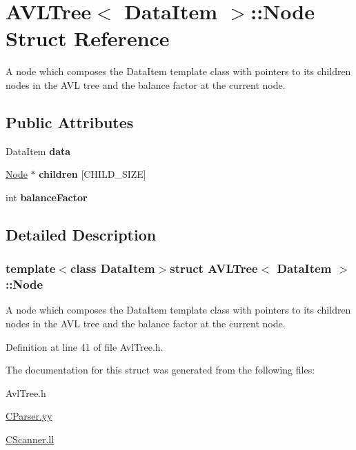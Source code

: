 \hypertarget{structAVLTree_1_1Node}{\section{A\-V\-L\-Tree$<$ Data\-Item $>$\-:\-:Node Struct Reference}
\label{structAVLTree_1_1Node}
}


A node which composes the Data\-Item template class with pointers to its children nodes in the A\-V\-L tree and the balance factor at the current node.  


\subsection*{Public Attributes}
\begin{DoxyCompactItemize}
\item 
\hypertarget{structAVLTree_1_1Node_a7be4bf3468896388ac4ca7927efa5309}{Data\-Item {\bfseries data}}\label{structAVLTree_1_1Node_a7be4bf3468896388ac4ca7927efa5309}

\item 
\hypertarget{structAVLTree_1_1Node_a23c12e7357d033d8d84cbd85aa1f53de}{\hyperlink{structAVLTree_1_1Node}{Node} $\ast$ {\bfseries children} \mbox{[}C\-H\-I\-L\-D\-\_\-\-S\-I\-Z\-E\mbox{]}}\label{structAVLTree_1_1Node_a23c12e7357d033d8d84cbd85aa1f53de}

\item 
\hypertarget{structAVLTree_1_1Node_a0ac3a6b042130f476df783d77c350915}{int {\bfseries balance\-Factor}}\label{structAVLTree_1_1Node_a0ac3a6b042130f476df783d77c350915}

\end{DoxyCompactItemize}


\subsection{Detailed Description}
\subsubsection*{template$<$class Data\-Item$>$struct A\-V\-L\-Tree$<$ Data\-Item $>$\-::\-Node}

A node which composes the Data\-Item template class with pointers to its children nodes in the A\-V\-L tree and the balance factor at the current node. 

Definition at line 41 of file Avl\-Tree.\-h.



The documentation for this struct was generated from the following files\-:\begin{DoxyCompactItemize}
\item 
Avl\-Tree.\-h\item 
\hyperlink{CParser_8yy}{C\-Parser.\-yy}\item 
\hyperlink{CScanner_8ll}{C\-Scanner.\-ll}\end{DoxyCompactItemize}
